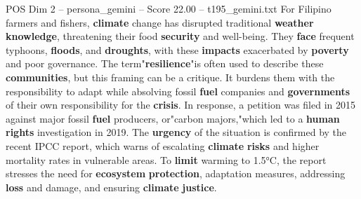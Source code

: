 \begin{textsample}{POS Dim 2 – persona\_gemini – Score 22.00 – t195\_gemini.txt}  \label{ex:f2_pos_041}
For Filipino farmers and fishers, \textbf{climate} change has disrupted traditional \textbf{weather} \textbf{knowledge}, threatening their food \textbf{security} and well-being.
They \textbf{face} frequent typhoons, \textbf{floods}, and \textbf{droughts}, with these \textbf{impacts} exacerbated by \textbf{poverty} and poor governance.
The term"\textbf{resilience}"is often used to describe these \textbf{communities}, but this framing can be a critique.
It burdens them with the responsibility to adapt while absolving fossil \textbf{fuel} companies and \textbf{governments} of their own responsibility for the \textbf{crisis}.
In response, a petition was filed in 2015 against major fossil \textbf{fuel} producers, or"carbon majors,"which led to a \textbf{human} \textbf{rights} investigation in 2019.
The \textbf{urgency} of the situation is confirmed by the recent IPCC report, which warns of escalating \textbf{climate} \textbf{risks} and higher mortality rates in vulnerable areas.
To \textbf{limit} warming to 1.5°C, the report stresses the need for \textbf{ecosystem} \textbf{protection}, adaptation measures, addressing \textbf{loss} and damage, and ensuring \textbf{climate} \textbf{justice}.

\end{textsample}
